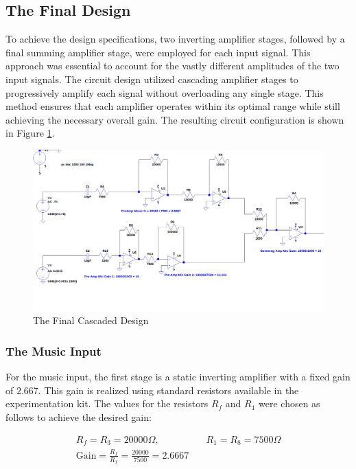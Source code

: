 \documentclass[12pt]{article}
\begin{document}
\subsection{The Final Design}
To achieve the design specifications, two inverting amplifier stages, followed by a final summing amplifier stage, were employed for each input signal. This approach was essential to account for the vastly different amplitudes of the two input signals. The circuit design utilized cascading amplifier stages to progressively amplify each signal without overloading any single stage. This method ensures that each amplifier operates within its optimal range while still achieving the necessary overall gain. The resulting circuit configuration is shown in Figure \ref{fig:fullcircuit}.

\begin{figure}[H]
	\centering
	\includegraphics[width=1\textwidth]{dp_03}
	\caption{The Final Cascaded Design}
	\label{fig:fullcircuit}
\end{figure}

\subsubsection{The Music Input}
For the music input, the first stage is a static inverting amplifier with a fixed gain of $2.667$. This gain is realized using standard resistors available in the experimentation kit. The values for the resistors $R_f$ and $R_1$ were chosen as follows to achieve the desired gain:

\begin{align*}
	R_f = R_3 = 20000\Omega, \quad & \quad R_1 = R_8 = 7500\Omega \\
	\text{Gain} = \frac{R_f}{R_1} = \frac{20000}{7500} = 2.6667
\end{align*}
\end{document}
